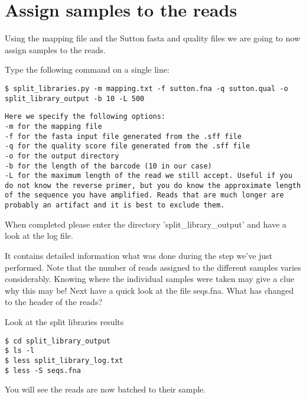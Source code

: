 \documentclass[a4paper,12pt,twoside]{memoir}
\begin{document}
\clearpage

\section{Assign samples to the reads}

\begin{steps}
Using the mapping file and the Sutton fasta and quality files we are going to now assign samples to the reads.

Type the following command on a single line:
\begin{lstlisting}
$ split_libraries.py -m mapping.txt -f sutton.fna -q sutton.qual -o split_library_output -b 10 -L 500
\end{lstlisting}
\end{steps}

\begin{information}
\begin{lstlisting}
Here we specify the following options:
-m for the mapping file
-f for the fasta input file generated from the .sff file
-q for the quality score file generated from the .sff file
-o for the output directory
-b for the length of the barcode (10 in our case)
-L for the maximum length of the read we still accept. Useful if you do not know the reverse primer, but you do know the approximate length of the sequence you have amplified. Reads that are much longer are probably an artifact and it is best to exclude them.
\end{lstlisting}
\end{information}

\begin{steps}
When completed please enter the directory 'split\_library\_output' and have a look at the log file. 

It contains detailed information what was done during the step we've just performed. Note that the number of reads assigned to the different samples varies considerably. Knowing where the individual samples were taken may give a clue why this may be! Next have a quick look at the file seqs.fna. What has changed to the header of the reads?

Look at the split libraries results
\begin{lstlisting}
$ cd split_library_output
$ ls -l
$ less split_library_log.txt
$ less -S seqs.fna
\end{lstlisting}
You will see the reads are now batched to their sample.
\end{steps}
\end{document}
